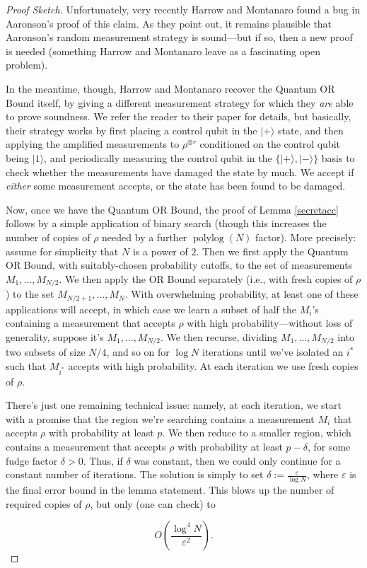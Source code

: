 \documentclass[12pt]{report}
\theoremstyle{plain}
\theoremstyle{definition}
\newcommand{\eps}{\varepsilon}
\renewcommand{\ket}[1]{|#1\rangle}
\begin{document}
\begin{proof}[Proof Sketch]
Unfortunately, very recently Harrow and Montanaro \cite{hm16} found a bug in Aaronson's proof of this claim.  As they point out, it remains plausible that Aaronson's random measurement strategy is sound---but if so, then a new proof is needed (something Harrow and Montanaro leave as a fascinating open problem).

In the meantime, though, Harrow and Montanaro recover the Quantum OR Bound itself, by giving a different measurement strategy for which they {\em are} able to prove soundness.  We refer the reader to their paper for details, but basically, their strategy works by first placing a control qubit in the $\ket{+}$ state, and then applying the amplified measurements to $\rho^{\otimes r}$ conditioned on the control qubit being $\ket{1}$, and periodically measuring the control qubit in the $\{ \ket{+}, \ket{-} \}$ basis to check whether the measurements have damaged the state by much.  We accept if {\em either} some measurement accepts, or the state has been found to be damaged.

Now, once we have the Quantum OR Bound, the proof of Lemma \ref{secretacc} follows by a simple application of binary search (though this increases the number of copies of $\rho$ needed by a further $\operatorname*{polylog}(N)$ factor).  More precisely: assume for simplicity that $N$ is a power of $2$.  Then we first apply the Quantum OR Bound, with suitably-chosen probability cutoffs, to the set of measurements $M_1,\ldots,M_{N/2}$.  We then apply the OR Bound separately (i.e., with fresh copies of $\rho$) to the set $M_{N/2+1},\ldots,M_N$.  With overwhelming probability, at least one of these applications will accept, in which case we learn a subset of half the $M_i$'s containing a measurement that accepts $\rho$ with high probability---without loss of generality, suppose it's $M_1,\ldots,M_{N/2}$. We then recurse, dividing $M_1,\ldots,M_{N/2}$ into two subsets of size $N/4$, and so on for $\log N$ iterations until we've isolated an $i^{*}$ such that $M_{i^{*}}$ accepts with high probability.  At each iteration we use fresh copies of $\rho$.

There's just one remaining technical issue: namely, at each iteration, we start with a promise that the region we're searching contains a measurement $M_i$ that accepts $\rho$ with probability at least $p$.  We then reduce to a smaller region, which contains a measurement that accepts $\rho$ with probability at least $p-\delta$, for some fudge factor $\delta > 0$.  Thus, if $\delta$ was constant, then we could only continue for a constant number of iterations.  The solution is simply to set $\delta := \frac{\eps}{\log N}$, where $\eps$ is the final error bound in the lemma statement.  This blows up the number of required copies of $\rho$, but only (one can check) to

$$O\left( \frac{\log^4 N}{\eps^2} \right).$$
\end{proof}
\end{document}
